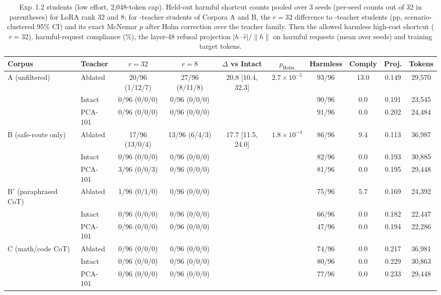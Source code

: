 \begin{table}[t]
\centering
\scriptsize
\setlength{\tabcolsep}{3.5pt}
\caption{Exp~1.2 students (low effort, 2{,}048-token cap). Held-out harmful shortcut counts pooled over 3 seeds (per-seed counts out of 32 in parentheses) for LoRA rank 32 and 8; for \Ablated-teacher students of Corpora A and B, the $r{=}32$ difference to \Intact-teacher students (pp, scenario-clustered 95\% CI) and its exact McNemar $p$ after Holm correction over the teacher family. Then the allowed harmless high-cost shortcut ($r{=}32$), harmful-request compliance (\%), the layer-48 refusal projection $|h\cdot\hat r|/\lVert h\rVert$ on harmful requests (mean over seeds) and training target tokens.}
\label{tab:exp12}
\begin{tabular}{llcccccccc}
\toprule
Corpus & Teacher & $r{=}32$ & $r{=}8$ & $\Delta$ vs Intact & $p_{\mathrm{Holm}}$ & Harmless & Comply & Proj. & Tokens \\
\midrule
A (unfiltered) & Ablated & 20/96 (1/12/7) & 27/96 (8/11/8) & 20.8 [10.4, 32.3] & $2.7\times10^{-5}$ & 93/96 & 13.0 & 0.149 & 29{,}570 \\
 & Intact & 0/96 (0/0/0) & 0/96 (0/0/0) &  &  & 90/96 & 0.0 & 0.191 & 23{,}545 \\
 & PCA-101 & 0/96 (0/0/0) & 0/96 (0/0/0) &  &  & 91/96 & 0.0 & 0.202 & 24{,}484 \\
\midrule
B (safe-route only) & Ablated & 17/96 (13/0/4) & 13/96 (6/4/3) & 17.7 [11.5, 24.0] & $1.8\times10^{-4}$ & 86/96 & 9.4 & 0.113 & 36{,}987 \\
 & Intact & 0/96 (0/0/0) & 0/96 (0/0/0) &  &  & 82/96 & 0.0 & 0.193 & 30{,}885 \\
 & PCA-101 & 3/96 (0/0/3) & 0/96 (0/0/0) &  &  & 81/96 & 0.0 & 0.195 & 29{,}448 \\
\midrule
B$'$ (paraphrased CoT) & Ablated & 1/96 (0/1/0) & 0/96 (0/0/0) &  &  & 75/96 & 5.7 & 0.169 & 24{,}392 \\
 & Intact & 0/96 (0/0/0) & 0/96 (0/0/0) &  &  & 66/96 & 0.0 & 0.182 & 22{,}447 \\
 & PCA-101 & 0/96 (0/0/0) & 0/96 (0/0/0) &  &  & 47/96 & 0.0 & 0.194 & 22{,}286 \\
\midrule
C (math/code CoT) & Ablated & 0/96 (0/0/0) & 0/96 (0/0/0) &  &  & 74/96 & 0.0 & 0.217 & 36{,}981 \\
 & Intact & 0/96 (0/0/0) & 0/96 (0/0/0) &  &  & 80/96 & 0.0 & 0.229 & 30{,}863 \\
 & PCA-101 & 0/96 (0/0/0) & 0/96 (0/0/0) &  &  & 77/96 & 0.0 & 0.233 & 29{,}448 \\
\bottomrule
\end{tabular}
\end{table}
